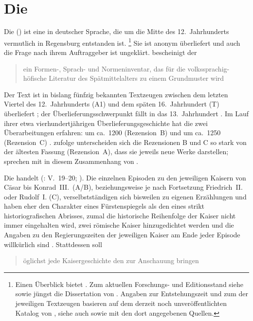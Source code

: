 \section{Die }
\label{sec:materialkc}

Die  (\KC{}) ist eine  in deutscher
Sprache, die um die Mitte des 12.~Jahrhunderts vermutlich in Regensburg
entstanden ist.%
%
	\footnote{Einen Überblick bietet \citet{nellmann1983}. Zum aktuellen
		Forschungs- und Editionsstand siehe
		\citet{chincaetal2019a} sowie jüngst die Dissertation von
		\citet{weis2022}. Angaben zur Entstehungszeit und zum
		 der jeweiligen Textzeugen basieren auf dem derzeit
		noch unveröffentlichten Katalog von \citet{wolf:kckat}, siehe auch
		\nocite{kcdigital} sowie
		\citet[s.\,v.~]{hsc} mit den dort angegebenen
		Quellen.}
%
Sie ist anonym überliefert und auch die Frage nach ihrem Auftraggeber ist
ungeklärt. \citet[92]{wolf2008} bescheinigt der \KC{}
\blockquote{ein Formen-, Sprach- und Normeninventar, das für die
volks\-sprachig-höfische Literatur des Spätmittelalters zu einem Grundmuster
wird}.

Der Text ist in bislang fünfzig bekannten Textzeugen zwischen dem letzten
Viertel des 12.~Jahrhunderts (A1) und dem späten 16.~Jahrhundert (T)
überliefert \autocite[39, 57]{wolf:kckat}; der
Überlieferungsschwerpunkt fällt in das 13.~Jahrhundert
\autocites[vgl.][s.\,v.~]{hsc}{kcdigital}. Im Lauf ihrer
etwa vierhundertjährigen Überlieferungsgeschichte hat die \KC{} zwei
Überarbeitungen erfahren: um ca.~1200 (Rezension~B) und um ca.~1250
(Rezension~C) \autocites{wolf2008}. \citet[369]{gaertner1995} zufolge
unterscheiden sich die Rezensionen B und C so stark von der ältesten Fassung
(Rezension~A), dass sie jeweils neue Werke darstellen;
\citet[142]{chincaetal2019a} sprechen mit \citet{bumkepeters2005} in diesem
Zusammenhang von .

Die \KC{} handelt   (\KC: V.~19--20; \cite[79]{schroeder1895}). Die einzelnen Episoden
zu den jeweiligen Kaisern von Cäsar bis Konrad~III.\ (A/B), beziehungsweise je
nach Fortsetzung Friedrich~II. oder Rudolf~I. (C), verselbstständigen sich
bisweilen zu eigenen Erzählungen und haben eher den Charakter eines
Fürstenspiegels als den eines strikt historiografischen
Abrisses, zumal die historische Reihenfolge der Kaiser nicht immer eingehalten
wird, zwei römische Kaiser hinzugedichtet werden und die Angaben zu den
Regierungszeiten der jeweiligen Kaiser am Ende jeder Episode willkürlich sind
\autocite[954--960]{nellmann1983}. Stattdessen soll
\blockcquote[957]{nellmann1983}{öglichst jede Kaisergeschichte
\textelp{} den  \textelp{} zur Anschauung bringen}.

